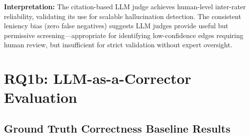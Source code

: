 \textbf{Interpretation:} The citation-based LLM judge achieves human-level inter-rater reliability, validating its use for scalable hallucination detection. The consistent leniency bias (zero false negatives) suggests LLM judges provide useful but permissive screening---appropriate for identifying low-confidence edges requiring human review, but insufficient for strict validation without expert oversight.

\section{RQ1b: LLM-as-a-Corrector Evaluation}

\subsection{Ground Truth Correctness Baseline Results}

